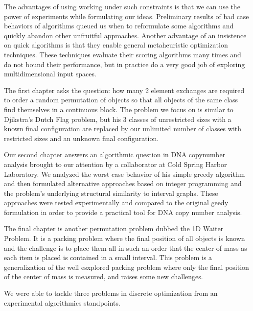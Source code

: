 \documentclass[11pt]{article}
\begin{document}
The advantages of using working under such constraints is that we can use the power of experiments while formulating our ideas. Preliminary results of bad case behaviors of algorithms queued us when to reformulate some algorithms and quickly abandon other unfruitful approaches. Another advantage of an insistence on quick algorithms is that they enable general metaheuristic optimization techniques. These techniques evaluate their scoring algorithms many times and do not bound their performance, but in practice do a very good job of exploring multidimensional input spaces.

The first chapter asks the question: how many 2 element exchanges are required to order a random permutation of objects so that all objects of the same class find themselves in a continuous block. The problem we focus on is similar to Djikstra’s Dutch Flag problem, but his 3 classes of unrestricted sizes with a known final configuration are replaced by our unlimited number of classes with restricted sizes and an unknown final configuration.

Our second chapter answers an algorithmic question in DNA copynumber analysis brought to our attention by a collaborator at Cold Spring Harbor Laboratory. We analyzed the worst case behavior of his simple greedy algorithm and then formulated alternative approaches based on integer programming and the problem’s underlying structural similarity to interval graphs.  These approaches were tested experimentally and compared to the original geedy formulation in order to provide a practical tool for DNA copy number analysis.

The final chapter is another permutation problem dubbed the 1D Waiter Problem.  It is a packing problem where the final position of all objects is known and the challenge is to place them all in such an order that the center of mass as each item is placed is contained in a small interval.  This problem is a generalization of the well esxplored packing problem where only the final position of the center of mass is measured, and raises some new challenges.  






We were able to tackle three problems in discrete optimization from an experimental algorithmics standpoints.  
\end{document}
